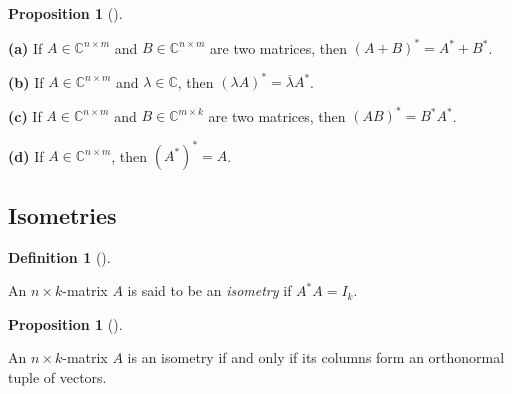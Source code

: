 \documentclass[numbers=enddot,12pt,final,onecolumn,notitlepage]{scrartcl}%
\numberwithin{exer}{subsection}
\theoremstyle{definition}
\newtheorem{prop}[theo]{Proposition}
\newenvironment{proposition}[1][]
{\begin{prop}[#1]\begin{leftbar}}
{\end{leftbar}\end{prop}}
\newtheorem{defi}[theo]{Definition}
\newenvironment{definition}[1][]
{\begin{defi}[#1]\begin{leftbar}}
{\end{leftbar}\end{defi}}
\begin{document}
\begin{proposition}
\label{prop.unitary.(AB)*}\textbf{(a)} If $A\in\mathbb{C}^{n\times m}$ and
$B\in\mathbb{C}^{n\times m}$ are two matrices, then $\left(  A+B\right)
^{\ast}=A^{\ast}+B^{\ast}$.

\textbf{(b)} If $A\in\mathbb{C}^{n\times m}$ and $\lambda\in\mathbb{C}$, then
$\left(  \lambda A\right)  ^{\ast}=\overline{\lambda}A^{\ast}$.

\textbf{(c)} If $A\in\mathbb{C}^{n\times m}$ and $B\in\mathbb{C}^{m\times k}$
are two matrices, then $\left(  AB\right)  ^{\ast}=B^{\ast}A^{\ast}$.

\textbf{(d)} If $A\in\mathbb{C}^{n\times m}$, then $\left(  A^{\ast}\right)
^{\ast}=A$.
\end{proposition}

\subsection{Isometries}

\begin{definition}
\label{def.unitary.innerprod.isometry}An $n\times k$-matrix $A$ is said to be
an \emph{isometry} if $A^{\ast}A=I_{k}$.
\end{definition}

\begin{proposition}
\label{prop.unitary.innerprod.isometry.2}An $n\times k$-matrix $A$ is an
isometry if and only if its columns form an orthonormal tuple of vectors.
\end{proposition}
\end{document}
